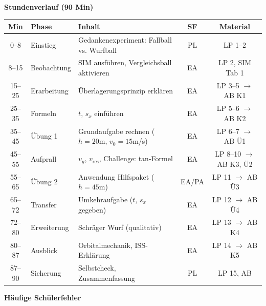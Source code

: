 \documentclass[10pt, a4paper]{article}
\newcommand{\fachfarbe}{physik}
\newcommand{\abschnitt}[1]{%
    \vspace{8pt}
    \noindent\textbf{\textcolor{\fachfarbe}{#1}}
    \vspace{4pt}
}
\begin{document}
\abschnitt{Stundenverlauf (90 Min)}

\begin{tabular}{|c|p{2.2cm}|p{5.5cm}|c|c|}
\hline
\textbf{Min} & \textbf{Phase} & \textbf{Inhalt} & \textbf{SF} & \textbf{Material} \\
\hline
0--8 & Einstieg & Gedankenexperiment: Fallball vs. Wurfball & PL & LP 1--2 \\
\hline
8--15 & Beobachtung & SIM ausführen, Vergleichsball aktivieren & EA & LP 2, SIM Tab 1 \\
\hline
15--25 & Erarbeitung & Überlagerungsprinzip erklären & EA & LP 3--5 $\to$ AB K1 \\
\hline
25--35 & Formeln & $t$, $s_x$ einführen & EA & LP 5--6 $\to$ AB K2 \\
\hline
35--45 & Übung 1 & Grundaufgabe rechnen ($h=20$m, $v_0=15$m/s) & EA & LP 6--7 $\to$ AB Ü1 \\
\hline
45--55 & Aufprall & $v_y$, $v_{\text{res}}$, Challenge: tan-Formel & EA & LP 8--10 $\to$ AB K3, Ü2 \\
\hline
55--65 & Übung 2 & Anwendung Hilfspaket ($h=45$m) & EA/PA & LP 11 $\to$ AB Ü3 \\
\hline
65--72 & Transfer & Umkehraufgabe ($t$, $s_x$ gegeben) & EA & LP 12 $\to$ AB Ü4 \\
\hline
72--80 & Erweiterung & Schräger Wurf (qualitativ) & EA & LP 13 $\to$ AB K4 \\
\hline
80--87 & Ausblick & Orbitalmechanik, ISS-Erklärung & EA & LP 14 $\to$ AB K5 \\
\hline
87--90 & Sicherung & Selbstcheck, Zusammenfassung & PL & LP 15, AB \\
\hline
\end{tabular}

\vspace{8pt}


\abschnitt{Häufige Schülerfehler}
\end{document}
